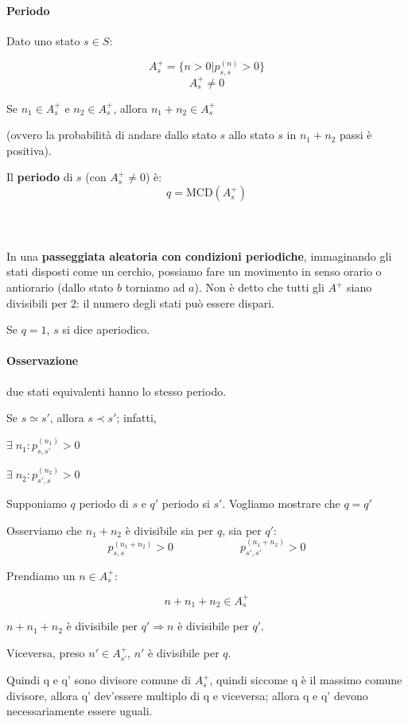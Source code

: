 \documentclass[a4paper,12pt]{book}
\begin{document}
\paragraph{Periodo} Dato uno stato $ s \in S $:

$$ A^+_s = \{ n > 0 | p_{s,s}^{(n)} > 0\} $$ %
$$ A^+_s \ne 0 $$

Se $ n_1 \in A^+_s $ e $ n_2 \in A^+_s $, allora $ n_1 + n_2 \in A^+_s $

(ovvero la probabilità di andare dallo stato $ s $ allo stato $ s $ in $ n_1 + n_2 $ passi è positiva).

Il \textbf{periodo} di $ s $ (con $ A^+_s \ne 0 $) è:
$$ q = \text{MCD}(A^+_s) $$\\
\\
\\
In una \textbf{passeggiata aleatoria con condizioni periodiche}, immaginando gli stati disposti come un cerchio, possiamo fare un movimento in senso orario o antiorario (dallo stato $ b $ torniamo ad $ a $). Non è detto che tutti gli $ A^+ $ siano divisibili per 2: il numero degli stati può essere dispari. 

Se $ q = 1 $, $ s $ si dice aperiodico. 

\paragraph{Osservazione} due stati equivalenti hanno lo stesso periodo.

Se $ s \simeq s' $, allora $ s \prec s' $; infatti, 

$ \exists \; n_1 : p_{s,s'}^{(n_1)} > 0 $

$ \exists \; n_2 : p_{s',s}^{(n_2)} > 0 $

Supponiamo $ q $ periodo di $ s $ e $ q' $ periodo si $ s' $. Vogliamo mostrare che $ q = q' $

Osserviamo che $ n_1 + n_2 $ è divisibile sia per $ q $, sia per $ q' $:
$$ p_{s,s}^{(n_1 + n_2)} > 0 \qquad \qquad \qquad p_{s',s'}^{(n_1 + n_2)} > 0  $$

Prendiamo un $ n \in A^+_s $:

$$ n + n_1 + n_2 \in A^+_s $$

$ n + n_1 + n_2 $ è divisibile per $ q' \Rightarrow n$ è divisibile per $ q' $.

Viceversa, preso $ n' \in A^+_{s'} $, $ n' $ è divisibile per $ q $.

Quindi q e q' sono divisore comune di $A^+_s$, quindi siccome q è il massimo comune divisore, allora q' dev'essere multiplo di q e viceversa; allora q e q' devono necessariamente essere uguali. 
\end{document}
